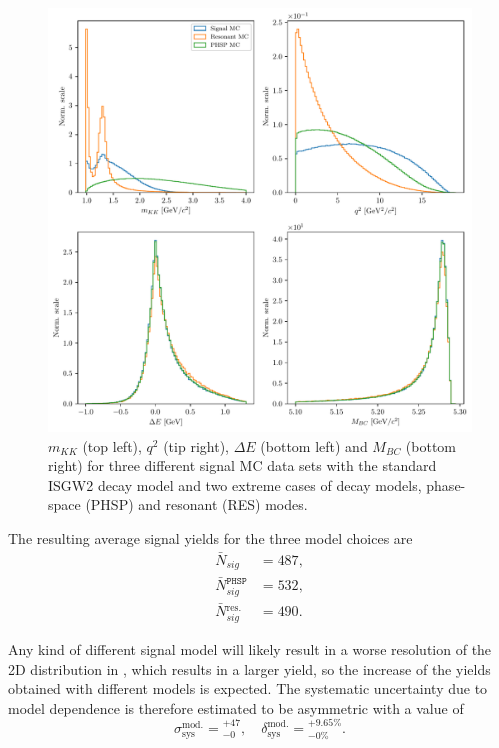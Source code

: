 \begin{figure}[H]
	\centering
	\captionsetup{width=0.8\linewidth}
	\includegraphics[width=\linewidth]{fig/model_cases}
	\caption{$m_{KK}$ (top left), $q^2$ (tip right), $\Delta E$ (bottom left) and $M_{BC}$ (bottom right) for three different signal MC data sets with the standard ISGW2 decay model and two extreme cases of decay models, phase-space (PHSP) and resonant (RES) modes.}
	\label{fig:model_cases}
\end{figure}

The resulting average signal yields for the three model choices are
\begin{align}
\bar N {}_{sig} &= 487, \\
\bar N {}_{sig}^{\mathtt{PHSP}} &= 532, \\
\bar N {}_{sig}^{\mathrm{res.}} &= 490.
\end{align}

Any kind of different signal model will likely result in a worse resolution of the 2D distribution in \vars, which results in a larger yield, so the increase of the yields obtained with different models is expected. The systematic uncertainty due to model dependence is therefore estimated to be asymmetric with a value of 
\begin{equation}
\sigma_{\mathrm{sys}}^{\mathrm{mod.}} = {}^{+47}_{-0},\quad \delta_{\mathrm{sys}}^{\mathrm{mod.}} = {}^{+9.65\%}_{-0\%}.
\end{equation}

